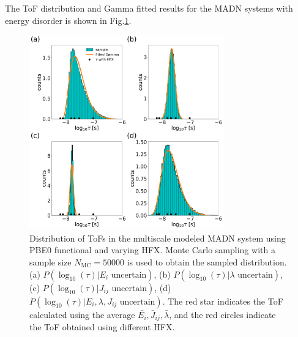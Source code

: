 \documentclass[letterpaper,12pt]{article}
\begin{document}
The ToF distribution and Gamma fitted results for the MADN systems with energy disorder is shown in Fig.\ref{fig:mle_MADN_withE}.
%
\begin{figure}[H]
    \centering
    \includegraphics[width=0.75\textwidth]{figs/MADN_HFX/fig_mle_MADN_withE.pdf}
    \caption{Distribution of ToFs in the multiscale modeled MADN system using PBE0 functional and varying HFX. Monte Carlo sampling with a sample size $N_\text{MC}=50000$ is used to obtain the sampled distribution.
    (a) $P(\log_{10}(\tau)|E_i \text{ uncertain})$, 
    (b) $P(\log_{10}(\tau)|\lambda \text{ uncertain})$, 
    (c) $P(\log_{10}(\tau)|J_{ij} \text{ uncertain})$, 
    (d) $P(\log_{10}(\tau)|E_i, \lambda, J_{ij} \text{ uncertain})$. The red star indicates the ToF calculated using the average $\bar{E_i}, \bar{J}_{ij}, \bar{\lambda}$, and the red circles indicate the ToF obtained using different HFX.}
    \label{fig:mle_MADN_withE}
\end{figure}
%

\end{document}
